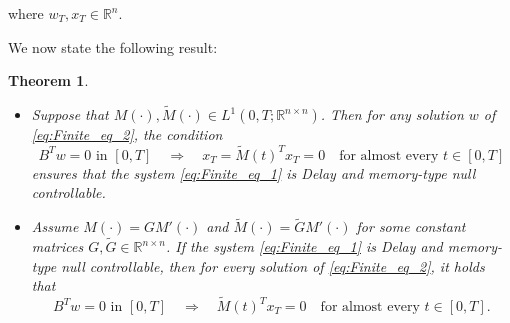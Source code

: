 \documentclass[12pt]{article}
\theoremstyle{plain}
\newtheorem{theorem}{Theorem}[section]
\theoremstyle{definition}
\begin{document}
where \( w_T, x_T \in \mathbb{R}^n \).

We now state the following result:

\begin{theorem}\label{th:Finite_the_1}
    \begin{itemize}
    \item[(i)] Suppose that \( M(\cdot), \widetilde{M}(\cdot) \in L^1(0,T;\mathbb{R}^{n \times n}) \). Then for any solution \( w \) of \eqref{eq:Finite_eq_2}, the condition
    \begin{equation}\label{eq:Finite_eq_3}
         B^T w = 0 \text{ in } [0,T] \quad \Rightarrow \quad x_T = \widetilde{M}(t)^T x_T = 0 \quad \text{for almost every } t \in [0,T]
    \end{equation}
    ensures that the system \eqref{eq:Finite_eq_1} is Delay and memory-type null controllable.

    \item[(ii)] Assume \( M(\cdot) = G M'(\cdot) \) and \( \widetilde{M}(\cdot) = \widetilde{G} M'(\cdot) \) for some constant matrices \( G, \widetilde{G} \in \mathbb{R}^{n \times n} \). If the system \eqref{eq:Finite_eq_1} is Delay and memory-type null controllable, then for every solution of \eqref{eq:Finite_eq_2}, it holds that
     \begin{equation}\label{eq:Finite_eq_4}
         B^T w = 0 \text{ in } [0,T] \quad \Rightarrow \quad \widetilde{M}(t)^T x_T = 0 \quad \text{for almost every } t \in [0,T].
    \end{equation}
    \end{itemize}
\end{theorem}
\end{document}
